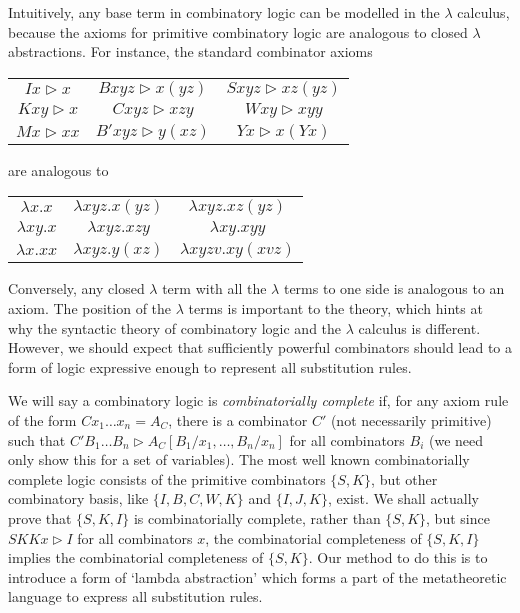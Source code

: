 Intuitively, any base term in combinatory logic can be modelled in the $\lambda$ calculus, because the axioms for primitive combinatory logic are analogous to closed $\lambda$ abstractions. For instance, the standard combinator axioms
%
\begin{center}
\begin{tabular}{ c c c }
 $Ix \rhd x$ & $Bxyz \rhd x(yz)$ & $Sxyz \rhd xz(yz)$ \\ 
 $Kxy \rhd x$ & $Cxyz \rhd xzy$ & $Wxy \rhd xyy$ \\  
 $Mx \rhd xx$ & $B'xyz \rhd y(xz)$ & $Yx \rhd x(Yx)$
\end{tabular}
\end{center}
%
are analogous to
%
\begin{center}
\begin{tabular}{ c c c }
 $\lambda x.x$ & $\lambda xyz.x(yz)$ & $\lambda xyz.xz(yz)$ \\ 
 $\lambda xy.x$ & $\lambda xyz.xzy$ & $\lambda xy.xyy$ \\  
 $\lambda x.xx$ & $\lambda xyz.y(xz)$ & $\lambda xyzv.xy(xvz)$
\end{tabular}
\end{center}
%
Conversely, any closed $\lambda$ term with all the $\lambda$ terms to one side is analogous to an axiom. The position of the $\lambda$ terms is important to the theory, which hints at why the syntactic theory of combinatory logic and the $\lambda$ calculus is different. However, we should expect that sufficiently powerful combinators should lead to a form of logic expressive enough to represent all substitution rules.

We will say a combinatory logic is \emph{combinatorially complete} if, for any axiom rule of the form $Cx_1 \dots x_n = A_C$, there is a combinator $C'$ (not necessarily primitive) such that $C'B_1 \dots B_n \rhd A_C[B_1/x_1, \dots, B_n/x_n]$ for all combinators $B_i$ (we need only show this for a set of variables). The most well known combinatorially complete logic consists of the primitive combinators $\{ S, K \}$, but other combinatory basis, like $\{ I,B,C,W,K \}$ and $\{ I,J,K \}$, exist. We shall actually prove that $\{ S, K, I \}$ is combinatorially complete, rather than $\{ S, K \}$, but since $SKKx \rhd I$ for all combinators $x$, the combinatorial completeness of $\{ S, K, I \}$ implies the combinatorial completeness of $\{ S, K \}$. Our method to do this is to introduce a form of `lambda abstraction' which forms a part of the metatheoretic language to express all substitution rules.


